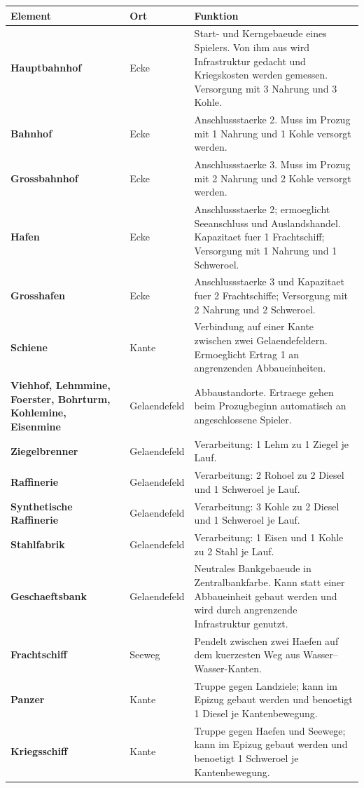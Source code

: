 \documentclass[11pt,a4paper,oneside,parskip=half]{scrreprt}
\begin{document}
\begin{longtable}{>{\bfseries}p{}p{}p{}}
\toprule
Element & Ort & Funktion \\
\midrule
Hauptbahnhof & Ecke & Start- und Kerngebaeude eines Spielers. Von ihm aus wird Infrastruktur gedacht und Kriegskosten werden gemessen. Versorgung mit 3 Nahrung und 3 Kohle. \\
Bahnhof & Ecke & Anschlussstaerke 2. Muss im Prozug mit 1 Nahrung und 1 Kohle versorgt werden. \\
Grossbahnhof & Ecke & Anschlussstaerke 3. Muss im Prozug mit 2 Nahrung und 2 Kohle versorgt werden. \\
Hafen & Ecke & Anschlussstaerke 2; ermoeglicht Seeanschluss und Auslandshandel. Kapazitaet fuer 1 Frachtschiff; Versorgung mit 1 Nahrung und 1 Schweroel. \\
Grosshafen & Ecke & Anschlussstaerke 3 und Kapazitaet fuer 2 Frachtschiffe; Versorgung mit 2 Nahrung und 2 Schweroel. \\
Schiene & Kante & Verbindung auf einer Kante zwischen zwei Gelaendefeldern. Ermoeglicht Ertrag 1 an angrenzenden Abbaueinheiten. \\
Viehhof, Lehmmine, Foerster, Bohrturm, Kohlemine, Eisenmine & Gelaendefeld & Abbaustandorte. Ertraege gehen beim Prozugbeginn automatisch an angeschlossene Spieler. \\
Ziegelbrenner & Gelaendefeld & Verarbeitung: 1 Lehm zu 1 Ziegel je Lauf. \\
Raffinerie & Gelaendefeld & Verarbeitung: 2 Rohoel zu 2 Diesel und 1 Schweroel je Lauf. \\
Synthetische Raffinerie & Gelaendefeld & Verarbeitung: 3 Kohle zu 2 Diesel und 1 Schweroel je Lauf. \\
Stahlfabrik & Gelaendefeld & Verarbeitung: 1 Eisen und 1 Kohle zu 2 Stahl je Lauf. \\
Geschaeftsbank & Gelaendefeld & Neutrales Bankgebaeude in Zentralbankfarbe. Kann statt einer Abbaueinheit gebaut werden und wird durch angrenzende Infrastruktur genutzt. \\
Frachtschiff & Seeweg & Pendelt zwischen zwei Haefen auf dem kuerzesten Weg aus Wasser--Wasser-Kanten. \\
Panzer & Kante & Truppe gegen Landziele; kann im Epizug gebaut werden und benoetigt 1 Diesel je Kantenbewegung. \\
Kriegsschiff & Kante & Truppe gegen Haefen und Seewege; kann im Epizug gebaut werden und benoetigt 1 Schweroel je Kantenbewegung. \\
\bottomrule
\end{longtable}
\end{document}
